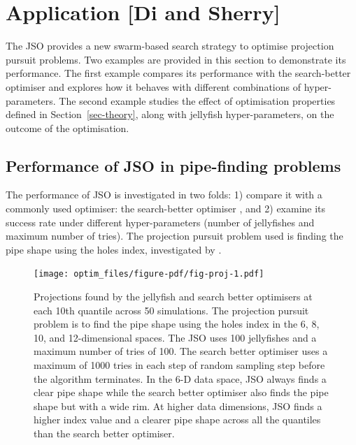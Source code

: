 \documentclass[
  number,
  preprint,
  3p]{elsarticle}
\begin{document}
\hypertarget{sec-app}{%
\section{Application {[}Di and Sherry{]}}\label{sec-app}}

The JSO provides a new swarm-based search strategy to optimise
projection pursuit problems. Two examples are provided in this section
to demonstrate its performance. The first example compares its
performance with the search-better optimiser and explores how it behaves
with different combinations of hyper-parameters. The second example
studies the effect of optimisation properties defined in
Section~\ref{sec-theory}, along with jellyfish hyper-parameters, on the
outcome of the optimisation.

\hypertarget{sec-app-1}{%
\subsection{Performance of JSO in pipe-finding
problems}\label{sec-app-1}}

The performance of JSO is investigated in two folds: 1) compare it with
a commonly used optimiser: the search-better optimiser
\citep{RJ-2021-105, laa_using_2020}, and 2) examine its success rate
under different hyper-parameters (number of jellyfishes and maximum
number of tries). The projection pursuit problem used is finding the
pipe shape using the holes index, investigated by
\citet{laa_using_2020}.

\begin{figure}

{\centering \texttt{[image: optim\_files/figure-pdf/fig-proj-1.pdf]}

}

\caption{\label{fig-proj}Projections found by the jellyfish and search
better optimisers at each 10th quantile across 50 simulations. The
projection pursuit problem is to find the pipe shape using the holes
index in the 6, 8, 10, and 12-dimensional spaces. The JSO uses 100
jellyfishes and a maximum number of tries of 100. The search better
optimiser uses a maximum of 1000 tries in each step of random sampling
step before the algorithm terminates. In the 6-D data space, JSO always
finds a clear pipe shape while the search better optimiser also finds
the pipe shape but with a wide rim. At higher data dimensions, JSO finds
a higher index value and a clearer pipe shape across all the quantiles
than the search better optimiser.}

\end{figure}
\end{document}
